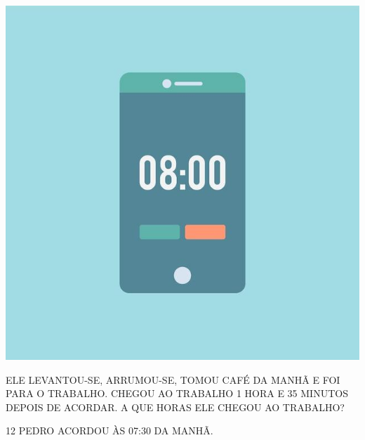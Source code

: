 \begin{minipage}{.5\textwidth}
\centering
\includegraphics[width=.5\textwidth]{media/image39.jpg}
\end{minipage}\hspace{.5cm}
\begin{minipage}{.5\textwidth}
ELE LEVANTOU-SE, ARRUMOU-SE, TOMOU CAFÉ DA MANHÃ E FOI PARA O TRABALHO. CHEGOU AO TRABALHO 1 HORA E 35 MINUTOS DEPOIS DE ACORDAR. A QUE HORAS ELE CHEGOU AO TRABALHO?
\end{minipage}\bigskip\bigskip


\num{12} PEDRO ACORDOU ÀS 07:30 DA MANHÃ.


